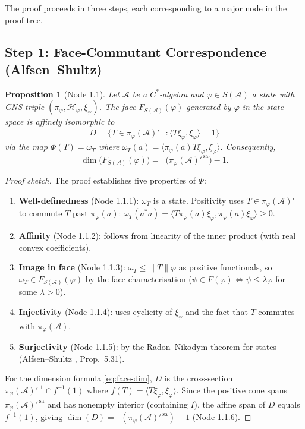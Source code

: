 \documentclass[11pt,a4paper]{article}
\theoremstyle{plain}
\newtheorem{proposition}[theorem]{Proposition}
\theoremstyle{definition}
\theoremstyle{remark}
\newcommand{\R}{\mathbb{R}}
\newcommand{\Hilbert}{\mathcal{H}}
\newcommand{\sa}{\mathrm{sa}}
\newcommand{\inner}[2]{\langle #1, #2 \rangle}
\newcommand{\norm}[1]{\|#1\|}
\DeclareMathOperator{\dimR}{dim_{\R}}
\begin{document}
The proof proceeds in three steps, each corresponding to a major node
in the proof tree.

\subsection{Step 1: Face-Commutant Correspondence (Alfsen--Shultz)}
\label{sec:face-commutant}

\begin{proposition}[Node 1.1]
\label{prop:face-commutant}
Let $\mathcal{A}$ be a $C^*$-algebra and $\varphi \in S(\mathcal{A})$
a state with GNS triple $(\pi_\varphi, \Hilbert_\varphi, \xi_\varphi)$.
The face $F_{S(\mathcal{A})}(\varphi)$ generated by $\varphi$ in the
state space is affinely isomorphic to
\[
  D = \bigl\{T \in \pi_\varphi(\mathcal{A})'^{\,+} :
  \inner{T\xi_\varphi}{\xi_\varphi} = 1\bigr\}
\]
via the map $\Phi(T) = \omega_T$ where
$\omega_T(a) = \inner{\pi_\varphi(a) T \xi_\varphi}{\xi_\varphi}$.
Consequently,
\begin{equation}
\label{eq:face-dim}
  \dim\bigl(F_{S(\mathcal{A})}(\varphi)\bigr)
  = \dimR\bigl(\pi_\varphi(\mathcal{A})'^{\,\sa}\bigr) - 1.
\end{equation}
\end{proposition}

\begin{proof}[Proof sketch]
The proof establishes five properties of $\Phi$:
\begin{enumerate}[label=(\roman*)]
  \item \textbf{Well-definedness} (Node 1.1.1): $\omega_T$ is a state.
        Positivity uses $T \in \pi_\varphi(\mathcal{A})'$ to commute $T$
        past $\pi_\varphi(a)$:
        $\omega_T(a^*a) = \inner{T\pi_\varphi(a)\xi_\varphi}
        {\pi_\varphi(a)\xi_\varphi} \ge 0$.
  \item \textbf{Affinity} (Node 1.1.2): follows from linearity of the
        inner product (with real convex coefficients).
  \item \textbf{Image in face} (Node 1.1.3): $\omega_T \le \norm{T}\varphi$
        as positive functionals, so $\omega_T \in F_{S(\mathcal{A})}(\varphi)$
        by the face characterisation
        ($\psi \in F(\varphi) \Leftrightarrow \psi \le \lambda\varphi$
        for some $\lambda > 0$).
  \item \textbf{Injectivity} (Node 1.1.4): uses cyclicity of $\xi_\varphi$
        and the fact that $T$ commutes with $\pi_\varphi(\mathcal{A})$.
  \item \textbf{Surjectivity} (Node 1.1.5): by the Radon--Nikodym theorem
        for states (Alfsen--Shultz \cite{alfsen2001}, Prop.\ 5.31).
\end{enumerate}
For the dimension formula \eqref{eq:face-dim}, $D$ is the cross-section
$\pi_\varphi(\mathcal{A})'^{\,+} \cap f^{-1}(1)$ where
$f(T) = \inner{T\xi_\varphi}{\xi_\varphi}$. Since the positive cone
spans $\pi_\varphi(\mathcal{A})'^{\,\sa}$ and has nonempty interior
(containing $I$), the affine span of $D$ equals $f^{-1}(1)$, giving
$\dim(D) = \dimR(\pi_\varphi(\mathcal{A})'^{\,\sa}) - 1$
(Node 1.1.6).
\end{proof}
\end{document}
